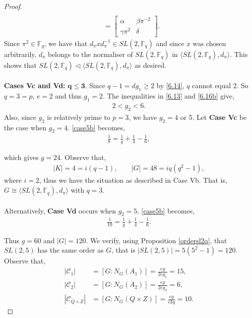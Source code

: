 \documentclass[a4paper , 11pt]{book}
\theoremstyle{definition}
\theoremstyle{remark}
\begin{document}
\begin{proof}
\begin{align*}
\\[1.5ex] &= \begin{bmatrix} \alpha & \beta \pi^{-2} \\ \gamma \pi^{2} & \delta \end{bmatrix}. 
\end{align*}
Since $\pi^2 \in \mathbb{F}_q$, we have that $d_\pi x d_\pi^{-1} \in SL(2,\mathbb{F}_q)$ and since $x$ was chosen arbitrarily, $d_\pi$ belongs to the normaliser of $SL(2,\mathbb{F}_q)$ in $\langle SL(2,\mathbb{F}_q), d_\pi \rangle$. This shows that $SL(2,\mathbb{F}_q) \vartriangleleft \langle SL(2,\mathbb{F}_q), d_\pi \rangle$ as desired. \\
\\
\textbullet \space \textbf{Cases Vc and Vd:} $\pmb{q \leq 3}$. Since $q - 1 = d g_1 \geq 2$ by \eqref{6.14}, $q$ cannot equal 2. So $q = 3 = p$, $e = 2$ and thus $g_1 = 2$. The inequalities in \eqref{6.13} and \eqref{6.16b} give,
\begin{align*} 2 < g_2 < 6.
\end{align*}
Also, since $g_2$ is relatively prime to $p=3$, we have $g_2 = 4$ or 5. Let \textbf{Case Vc} be the case when $g_2 = 4$. \eqref{case5b} becomes,
\begin{align*} \frac{1}{8} = \frac{1}{g} + \frac{1}{4} - \frac{1}{6},
\end{align*}

which gives $g = 24$. Observe that,
\begin{align*} |K| = 4 = i(q-1), \qquad |G| = 48 = iq(q^2-1),
\end{align*}
where $i=2$, thus we have the situation as described in Case Vb. That is, $G \cong \langle SL(2,\mathbb{F}_q), d_\pi \rangle$ with $q=3$.\\
\\
Alternatively, \textbf{Case Vd} occurs when $g_2 = 5$. \eqref{case5b} becomes,
\begin{align*} \frac{1}{10} = \frac{1}{g} + \frac{1}{4} - \frac{1}{6}.
\end{align*}

Thus $g = 60 $ and $|G| = 120$. We verify, using Proposition \ref{ordersl2q}, that $SL(2,5)$ has the same order as $G$, that is $|SL(2,5)| = 5(5^2-1) =120$. Observe that,
\begin{align*} |\mathcal{C}_1| &= [G : N_G(A_1)] = \frac{eg}{2eg_1} = 15,
\\[1ex] |\mathcal{C}_2| &= [G : N_G(A_2)] = \frac{eg}{2eg_2} = 6,
\\[1ex] |\mathcal{C}_{Q \times Z}| &= [G : N_G(Q \times Z)] = \frac{eg}{ekq} = 10.
\end{align*}


\end{proof}
\end{document}
